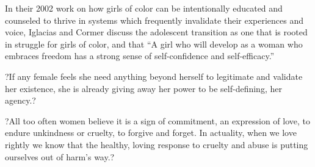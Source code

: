 \documentclass[a4paper, 11pt]{article} %
\begin{document}
In their 2002 work on how girls of color can be intentionally educated and counseled to thrive in systems which frequently invalidate their experiences and voice, Iglacias and Cormer discuss the adolescent transition as one that is rooted in struggle for girls of color, and that ``A girl who will develop as a woman who embraces freedom has a strong sense of self-confidence and self-efficacy.''\cite{iglesiascormier}

?If any female feels she need anything beyond herself to legitimate and validate her existence, she is already giving away her power to be self-defining, her agency.? \cite{hooksforeveryone}

?All too often women believe it is a sign of commitment, an expression of love, to endure unkindness or cruelty, to forgive and forget. In actuality, when we love rightly we know that the healthy, loving response to cruelty and abuse is putting ourselves out of harm's way.?\cite{newvisions}



{}


\end{document}
